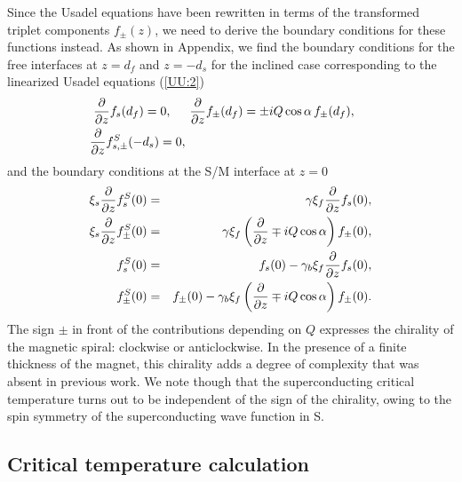 \documentclass[prb,amsmath,amssymb,reprint]{revtex4-2}
\begin{document}
Since the Usadel equations have been rewritten in terms of the transformed triplet components $f_{\pm}(z)$, we need to derive the boundary conditions for these functions instead. As shown in Appendix, we find the boundary conditions for the free interfaces at $z=d_{f}$ and $z=-d_{s}$ for the inclined case corresponding to the linearized Usadel
equations (\ref{UU:2})
\begin{eqnarray}
\frac{\partial }{\partial z}f_{s}(d_{f}) =  0,  \hspace*{0.5cm}
\frac{\partial }{\partial z}f_{\pm }(d_{f})  = \pm iQ\cos \alpha \,
f_{\pm }(d_{f}),   \hspace*{0.5cm} \label{BCfree} \\
\frac{\partial }{\partial z}f_{s,\pm }^{S}(-d_s)  =  0,  \hspace*{5.3cm} \notag
\end{eqnarray}
and the boundary conditions at the S/M interface at $z=0$
\begin{eqnarray}
\xi_s \frac{\partial }{\partial z}f_{s}^{S}(0) &=&\gamma \xi_f\frac{\partial }{\partial
z}f_{s}(0),  \notag \\
\xi_s \frac{\partial }{\partial z}f_{\pm }^{S}(0) &=&\gamma \xi_f \left( \frac{\partial
}{\partial z}\mp iQ\cos \alpha \right) f_{\pm }(0),  \label{BC:SM} \\
f_{s}^{S}(0) &=&f_{s}(0)-\gamma _{b} \xi_f \frac{\partial }{\partial z}f_{s}(0),
\notag \\
f_{\pm }^{S}(0) &=&f_{\pm }(0)-\gamma _{b} \xi_f \left( \frac{\partial }{\partial z}%
\mp iQ\cos \alpha \right) f_{\pm }(0).  \notag
\end{eqnarray}
The sign $\pm $ in front of the contributions depending on $Q$ expresses the chirality of the magnetic spiral: clockwise or anticlockwise. In the presence of a finite thickness of the magnet, this chirality adds a degree of complexity that was absent  in  previous work. We note though that the superconducting critical temperature turns out to be independent of the sign of the chirality, owing to the spin symmetry of the superconducting
wave function in S.

\subsection{Critical temperature calculation}
\end{document}

